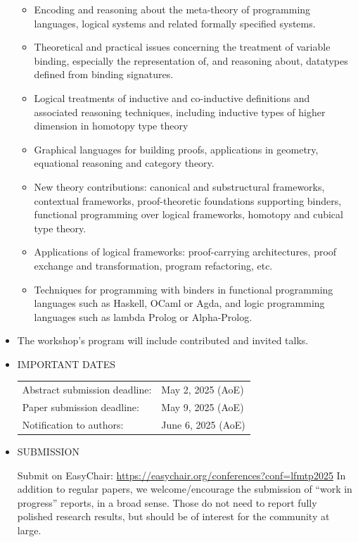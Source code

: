 \documentclass[prodmode,acmtecs]{acmsmall} %
\begin{document}
\begin{itemize}
\begin{itemize}\item  Encoding and reasoning about the meta-theory of programming languages, logical systems and related formally specified systems.
\item  Theoretical and practical issues concerning the treatment of variable binding, especially the representation of, and reasoning about, datatypes defined from binding signatures.
\item  Logical treatments of inductive and co-inductive definitions and associated reasoning techniques, including inductive types of higher dimension in homotopy type theory
\item  Graphical languages for building proofs, applications in geometry, equational reasoning and category theory.
\item  New theory contributions: canonical and substructural frameworks, contextual frameworks, proof-theoretic foundations supporting binders, functional programming over logical frameworks, homotopy and cubical type theory.
\item  Applications of logical frameworks: proof-carrying architectures, proof exchange and transformation, program refactoring, etc.
\item  Techniques for programming with binders in functional programming languages such as Haskell, OCaml or Agda, and logic programming languages such as lambda Prolog or Alpha-Prolog.
\end{itemize} 
\item  The workshop's program will include contributed and invited talks. 
 
\item  IMPORTANT DATES 
 
\begin{tabulary}{\linewidth}{LL}Abstract submission deadline:  & May 2, 2025 (AoE) \\
Paper submission deadline:  & May 9, 2025 (AoE) \\
Notification to authors:  & June 6, 2025 (AoE) \\
\end{tabulary}
 
\item  SUBMISSION 
 
  Submit on EasyChair: \href{https://easychair.org/conferences?conf=lfmtp2025}{https://easychair.org/conferences?conf=lfmtp2025} In addition to regular papers, we welcome/encourage the submission of ``work in progress'' reports, in a broad sense. Those do not need to report fully polished research results, but should be of interest for the community at large. 
 

\end{itemize}
\end{document}

